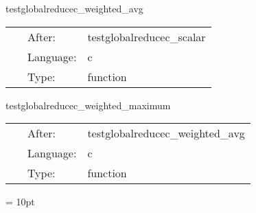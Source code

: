 
\hspace{5mm} testglobalreducec\_weighted\_avg 

\hspace{5mm}{\it test weighted global average reduction } 


\hspace{5mm}

 \begin{tabular*}{160mm}{cll} 
~ & After:  & testglobalreducec\_scalar \\ 
~ & Language:  & c \\ 
~ & Type:  & function \\ 
\end{tabular*} 


\vspace{5mm}


\hspace{5mm} testglobalreducec\_weighted\_maximum 

\hspace{5mm}{\it test weighted global maximum reduction } 


\hspace{5mm}

 \begin{tabular*}{160mm}{cll} 
~ & After:  & testglobalreducec\_weighted\_avg \\ 
~ & Language:  & c \\ 
~ & Type:  & function \\ 
\end{tabular*} 



\vspace{5mm}\parskip = 10pt 
